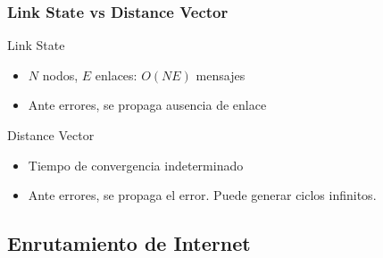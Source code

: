 \documentclass[letter]{beamer}
\begin{document}
\begin{frame}
  \frametitle{Link State vs Distance Vector}
  
  Link State
  \begin{itemize}
    \item $N$ nodos, $E$ enlaces: $O(NE)$ mensajes
    \item Ante errores, se propaga ausencia de enlace
  \end{itemize}
  Distance Vector
  \begin{itemize}
    \item Tiempo de convergencia indeterminado
    \item Ante errores, se propaga el error. Puede generar ciclos infinitos.
  \end{itemize}
  
\end{frame}
\subsection{Enrutamiento de Internet}
\end{document}
